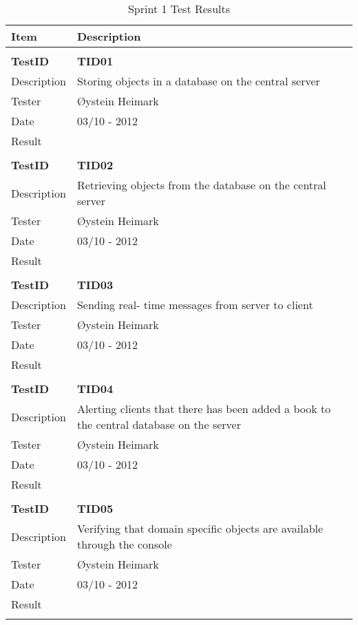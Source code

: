 \begin{table}
\caption{Sprint 1 Test Results}
\centering
\begin{tabular}{ l p{13cm} }

\hline 
Item			&Description		\\
\hline \\ [-2.0ex]

\bf{TestID}		&\bf{TID01}			\\
Description	&Storing objects in a database on the central server	\\
Tester		&Øystein Heimark	\\
Date			&03/10 - 2012	\\
Result		&				\\
\hline \\ [-2.0ex]

\bf{TestID}		&\bf{TID02}			\\
Description	&Retrieving objects from the database on the central server	\\
Tester		&Øystein Heimark	\\
Date			&03/10 - 2012	\\
Result		&				\\
\hline \\ [-2.0ex]

\bf{TestID}		&\bf{TID03}			\\
Description	&Sending real- time messages from server to client	\\
Tester		&Øystein Heimark	\\
Date			&03/10 - 2012	\\
Result		&				\\
\hline \\ [-2.0ex]

\bf{TestID}		&\bf{TID04}			\\
Description	&Alerting clients that there has been added a book to the central database on the server	\\
Tester		&Øystein Heimark	\\
Date			&03/10 - 2012	\\
Result		&				\\
\hline \\ [-2.0ex]

\bf{TestID}		&\bf{TID05}			\\
Description	&Verifying that domain specific objects are available through the console	\\
Tester		&Øystein Heimark	\\
Date			&03/10 - 2012	\\
Result		&				\\
\hline \\ [-2.0ex]


\end{tabular}
\end{table}
